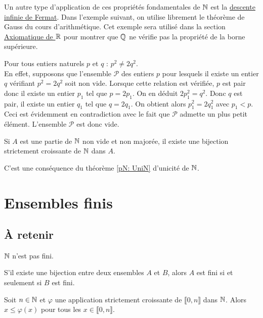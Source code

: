 Un autre type d'application de ces propriétés fondamentales de $\mathbb{N}$ est la \href{http://fr.wikipedia.org/wiki/M\%C3\%A9thode_de_descente_infinie}{descente infinie de Fermat}. Dans l'exemple suivant, on utilise librement le théorème de Gauss du cours d'arithmétique. Cet exemple sera utilisé dans la section \href{\baseurl C2192.pdf}{Axiomatique de $\mathbb{R}$} pour montrer que $\mathbb{Q}$ ne vérifie pas la propriété de la borne supérieure.
\begin{exple}
 Pour tous entiers naturels $p$ et $q$ : $p^2 \neq 2q^2$.\\
En effet, supposons que l'ensemble $\mathcal P$ des entiers $p$ pour lesquels il existe un entier $q$ vérifiant  $p^2=2q^2$ soit non vide. Lorsque cette relation est vérifiée, $p$ est pair donc il existe un entier $p_1$ tel que
$p=2p_1$. On en déduit $2p_1^2=q^2$. Donc $q$ est pair, il existe un entier $q_1$ tel que $q=2q_1$. On obtient alors $p_1^2=2q_1^2$ avec $p_1<p$. Ceci est évidemment en contradiction avec le fait que $\mathcal P$ admette un plus petit élément. L'ensemble $\mathcal P$ est donc vide.
\end{exple}

\begin{prop}[\ref{pN: PasMaj}]
Si $A$ est une partie de $\mathbb{N}$ non vide et non majorée, il existe une bijection strictement croissante de $\mathbb{N}$ dans $A$.  
\end{prop}
\begin{demo}
C'est une conséquence du théorème \ref{pN: UniN} d'unicité de $\mathbb{N}$.
\end{demo}


\section{Ensembles finis}
\subsection{\`A retenir}
\begin{propn}\label{pN: Nnfini}
 $\mathbb{N}$ n'est pas fini. 
\end{propn}

\begin{propn}\label{pN: CarFiBij}
 S'il existe une bijection entre deux ensembles $A$ et $B$, alors $A$ est fini si et seulement si $B$ est fini.
\end{propn}

\begin{propn}\label{pN: ScMin}
 Soit $n\in \mathbb{N}$ et $\varphi$ une application strictement croissante de $\llbracket 0, n\rrbracket$ dans $\mathbb{N}$. Alors $x\leq \varphi(x)$ pour tous les $x\in \llbracket 0, n\rrbracket$.
\end{propn}

